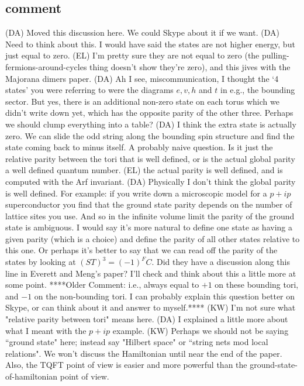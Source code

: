 \documentclass[12pt,a4paper]{article}
\newcommand{\kw}[1]{{\color{kwcolor}\footnotesize{(KW) #1}}}
\newcommand{\dave}[1]{{\color{ao(english)}\footnotesize{(DA) #1}}}
\newcommand{\ethan}[1]{{\color{amethyst}\footnotesize{(EL) #1}}}
\begin{document}
 


 
\subsection{comment}
\dave{Moved this discussion here. We could Skype about it if we want.}
\dave{Need to think about this. 
I would have said the states are not higher energy, but just equal to zero. 
\ethan{I'm pretty sure they are not equal to zero (the pulling-fermions-around-cycles 
thing doesn't show they're zero), and this jives with the Majorana dimers paper.}
\dave{Ah I see, miscommunication, I thought the `4 states' you were referring to were the 
diagrams $e,v,h$ and $t$ in e.g., the bounding sector.
But yes, there is an additional non-zero state on each torus which we didn't write down yet, 
which has the opposite parity of the other three. 
Perhaps we should clump everything into a table?}
\dave{I think the extra state is actually zero. We can slide the odd string along the bounding 
spin structure and find the state coming back to minus itself.}
A probably naive question. 
Is it just the relative parity between the tori that is well defined, or is the actual global parity a 
well defined quantum number. \ethan{the actual parity is well defined, and is computed with the Arf invariant.
\dave{Physically I don't think the global parity is well defined. 
For example: if you write down a microscopic model for a $p+ip$ superconductor you find that 
the ground state parity depends on the number of lattice sites you use.
And so in the infinite volume limit the parity of the ground state is ambiguous.
I would say it's more natural to define one state as having a given parity (which is a choice) 
and define the parity of all other states relative to this one.
Or perhaps it's better to say that we can read off the parity of the states by looking at $(ST)^3 = (-1)^FC$.
Did they have a discussion along this line in Everett and Meng's paper? 
I'll check and think about this a little more at some point.
}}
****Older Comment: i.e.,  always equal to $+1$ on these bounding tori, and $-1$ on the non-bounding tori.
I can probably explain this question better on Skype, or can think about it and answer to myself.****}
\kw{I'm not sure what "relative parity between tori" means here.}
\dave{I explained a little more about what I meant with the $p+ip$ example.}
\kw{Perhaps we should not be saying ``ground state" here; instead say "Hilbert space" or ``string nets mod local relations".
We won't discuss the Hamiltonian until near the end of the paper.
Also, the TQFT point of view is easier and more powerful than the ground-state-of-hamiltonian point of view.}
\end{document}
